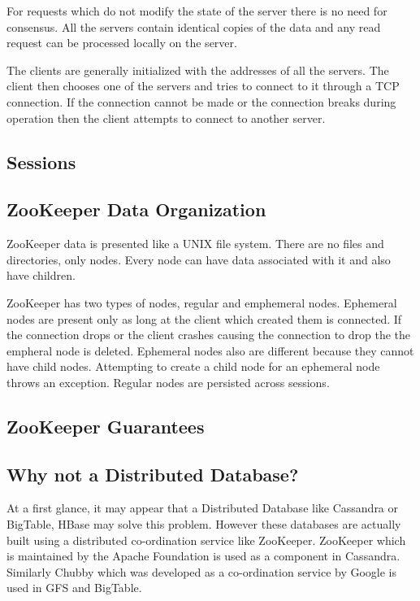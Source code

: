 For requests which do not modify the state of the server there is no need for consensus. All the servers contain identical copies of the data and any read request can be processed locally on the server. 

The clients are generally initialized with the addresses of all the servers. The client then chooses one of the servers and tries to connect to it through a TCP connection. If the connection cannot be made or the connection breaks during operation then the client attempts to connect to another server.


\subsection{Sessions}

\subsection{ZooKeeper Data Organization}
ZooKeeper data is presented like a UNIX file system. There are no files and directories, only nodes. Every node can have data associated with it and also have children. 



ZooKeeper has two types of nodes, regular and emphemeral nodes. Ephemeral nodes are present only as long at the client which created them is connected. If the connection drops or the client crashes causing the connection to drop the the empheral node is deleted. Ephemeral nodes also are different because they cannot have child nodes. Attempting to create a child node for an ephemeral node throws an exception. Regular nodes are persisted across sessions.

\subsection{ZooKeeper Guarantees}

\subsection{Why not a Distributed Database?}
At a first glance, it may appear that a Distributed Database like Cassandra or BigTable, HBase may solve this problem. However these databases are actually built using a distributed co-ordination service like ZooKeeper. ZooKeeper which is maintained by the Apache Foundation is used as a component in Cassandra. Similarly Chubby which was developed as a co-ordination service by Google is used in GFS and BigTable.

